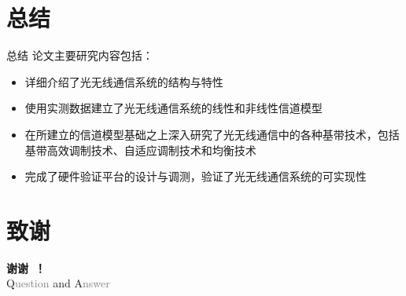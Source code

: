 \documentclass[mathserif, utf8, 9pt]{beamer}
\begin{document}
\section{总结}
\begin{frame}{总结}
    论文主要研究内容包括：
    \begin{itemize}
        \item 详细介绍了光无线通信系统的结构与特性
        \item 使用实测数据建立了光无线通信系统的线性和非线性\alert{信道模型}
        \item 在所建立的信道模型基础之上深入研究了光无线通信中的各种\alert{基带技术}，包括基带高效调制技术、自适应调制技术和均衡技术
        \item 完成了\alert{硬件验证平台}的设计与调测，验证了光无线通信系统的可实现性
    \end{itemize}
\end{frame}

\section*{致谢}
\begin{frame}
	\begin{center}
		\Huge{\bf{谢\quad{}谢~！}}\\
        \vspace{1em}
        \Huge{Q\textcolor{gray}{uestion} and A\textcolor{gray}{nswer}}
	\end{center}
\end{frame}
\end{document}
